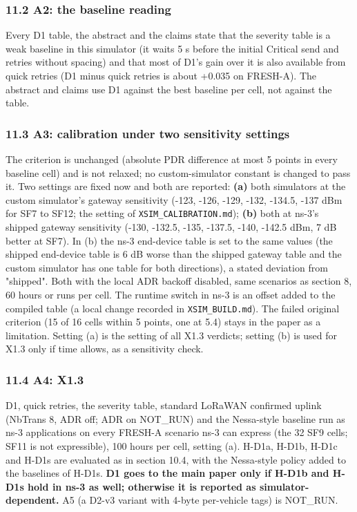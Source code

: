 \subsubsection*{11.2 A2: the baseline reading}
Every D1 table, the abstract and the claims state that the severity table is a weak baseline in this simulator (it waits 5 s before the initial Critical send and retries without spacing) and that most of D1's gain over it is also available from quick retries (D1 minus quick retries is about +0.035 on FRESH-A). The abstract and claims use D1 against the best baseline per cell, not against the table.

\subsubsection*{11.3 A3: calibration under two sensitivity settings}
The criterion is unchanged (absolute PDR difference at most 5 points in every baseline cell) and is not relaxed; no custom-simulator constant is changed to pass it. Two settings are fixed now and both are reported: \textbf{(a)} both simulators at the custom simulator's gateway sensitivity (-123, -126, -129, -132, -134.5, -137 dBm for SF7 to SF12; the setting of \texttt{XSIM\_CALIBRATION.md}); \textbf{(b)} both at ns-3's shipped gateway sensitivity (-130, -132.5, -135, -137.5, -140, -142.5 dBm, 7 dB better at SF7). In (b) the ns-3 end-device table is set to the same values (the shipped end-device table is 6 dB worse than the shipped gateway table and the custom simulator has one table for both directions), a stated deviation from "shipped". Both with the local ADR backoff disabled, same scenarios as section 8, 60 hours or runs per cell. The runtime switch in ns-3 is an offset added to the compiled table (a local change recorded in \texttt{XSIM\_BUILD.md}). The failed original criterion (15 of 16 cells within 5 points, one at 5.4) stays in the paper as a limitation. Setting (a) is the setting of all X1.3 verdicts; setting (b) is used for X1.3 only if time allows, as a sensitivity check.

\subsubsection*{11.4 A4: X1.3}
D1, quick retries, the severity table, standard LoRaWAN confirmed uplink (NbTrans 8, ADR off; ADR on NOT\_RUN) and the Nessa-style baseline run as ns-3 applications on every FRESH-A scenario ns-3 can express (the 32 SF9 cells; SF11 is not expressible), 100 hours per cell, setting (a). H-D1a, H-D1b, H-D1c and H-D1s are evaluated as in section 10.4, with the Nessa-style policy added to the baselines of H-D1s. \textbf{D1 goes to the main paper only if H-D1b and H-D1s hold in ns-3 as well; otherwise it is reported as simulator-dependent.} A5 (a D2-v3 variant with 4-byte per-vehicle tags) is NOT\_RUN.

